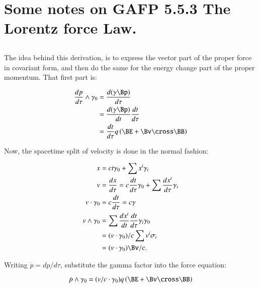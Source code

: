 
\chapter{Some notes on GAFP 5.5.3 The Lorentz force Law.}\label{chap:PJSrGAFPLorentzForce}

\section{}

The idea behind this derivation, is to express the vector part of the proper force in covariant form, and then
do the same for the energy change part of the proper momentum.  That first part is:

\begin{align*}
\frac{dp}{d\tau} \wedge \gamma_0
&= \frac{d (\gamma \Bp)}{d\tau} \\
&= \frac{d (\gamma \Bp)}{dt} \frac{dt}{d\tau} \\
&= \frac{dt}{d\tau} q \left( \BE + \Bv \cross \BB \right)
\end{align*}

Now, the spacetime split of velocity is done in the normal fashion:

\begin{align*}
x &= c t \gamma_0 + \sum x^i \gamma_i \\
v &= \frac{dx}{d\tau} = c \frac{dt}{d\tau} \gamma_0 + \sum \frac{dx^i}{d\tau} \gamma_i \\
v \cdot \gamma_0 &= c \frac{dt}{d\tau} = c \gamma \\
v \wedge \gamma_0
&= \sum \frac{dx^i}{dt} \frac{dt}{d\tau} \gamma_i \gamma_0 \\
&= (v \cdot \gamma_0)/c \sum v^i \sigma_i \\
&= (v \cdot \gamma_0) \Bv/c.
\end{align*}

Writing $\dot{p} = dp/d\tau$, substitute the gamma factor into the force equation:

\begin{equation*}
\dot{p} \wedge \gamma_0 = ( v/c \cdot \gamma_0 ) q \left( \BE + \Bv \cross \BB \right)
\end{equation*}

